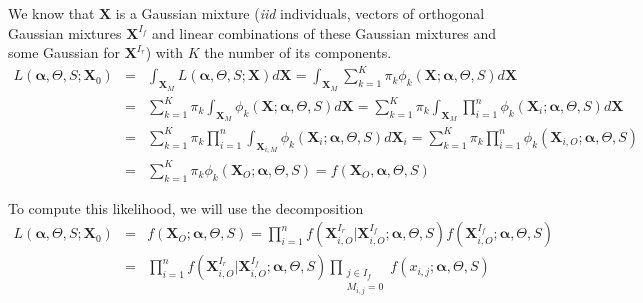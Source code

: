 \documentclass[12pt,a4paper]{report}
\begin{document}
We know that $\boldsymbol{X}$ is a Gaussian mixture ({\it iid} individuals, vectors of orthogonal Gaussian mixtures $\boldsymbol{X}^{I_f}$ and linear combinations of these Gaussian mixtures and some Gaussian for $\boldsymbol{X}^{I_r}$) with $K$ the number of its components.
\begin{eqnarray}
	L(\boldsymbol{\alpha},\Theta,S;\boldsymbol{X}_0)&=&\int_{\boldsymbol{X}_M}L(\boldsymbol{\alpha},\Theta,S;\boldsymbol{X})d\boldsymbol{X} 
	=\int_{\boldsymbol{X}_M}\sum_{k=1}^K \pi_k \phi_k(\boldsymbol{X};\boldsymbol{\alpha},\Theta,S)d\boldsymbol{X} \\
	&=&\sum_{k=1}^K \pi_k \int_{\boldsymbol{X}_M}\phi_k(\boldsymbol{X};\boldsymbol{\alpha},\Theta,S)d\boldsymbol{X} 
	=\sum_{k=1}^K \pi_k \int_{\boldsymbol{X}_M}\prod_{i=1}^n\phi_k(\boldsymbol{X}_i;\boldsymbol{\alpha},\Theta,S)d\boldsymbol{X} \\
	&=&\sum_{k=1}^K \pi_k \prod_{i=1}^n\int_{\boldsymbol{X}_{i,M}}\phi_k(\boldsymbol{X}_i;\boldsymbol{\alpha},\Theta,S)d\boldsymbol{X}_i 
	=\sum_{k=1}^K \pi_k \prod_{i=1}^n\phi_k(\boldsymbol{X}_{i,O};\boldsymbol{\alpha},\Theta,S)\\
	&=&\sum_{k=1}^K \pi_k \phi_k(\boldsymbol{X}_{O};\boldsymbol{\alpha},\Theta,S)=f(\boldsymbol{X}_{O},\boldsymbol{\alpha},\Theta,S)
\end{eqnarray}






To compute this likelihood, we will use the decomposition
\begin{eqnarray}
	L(\boldsymbol{\alpha},\Theta,S;\boldsymbol{X}_0)&=&f(\boldsymbol{X}_{O};\boldsymbol{\alpha},\Theta,S)=\prod_{i=1}^nf(\boldsymbol{X}^{I_r}_{i,O}|\boldsymbol{X}^{I_f}_{i,O};\boldsymbol{\alpha},\Theta,S)f(\boldsymbol{X}^{I_f}_{i,O};\boldsymbol{\alpha},\Theta,S) \\
	&=&\prod_{i=1}^nf(\boldsymbol{X}^{I_r}_{i,O}|\boldsymbol{X}^{I_f}_{i,O};\boldsymbol{\alpha},\Theta,S)\prod_{\substack{j \in I_f \\ M_{i,j}=0}}f(x_{i,j};\boldsymbol{\alpha},\Theta,S)
\end{eqnarray}
\end{document}
